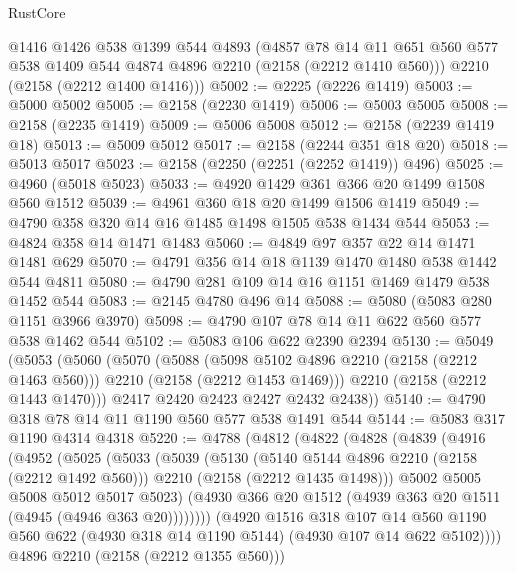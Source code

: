 \begin{lexlean}{RustCore}
\begin{coremodule}
      @1416
      @1426
      @538
      @1399
      @544
      @4893
      (@4857
        @78
        @14
        @11
        @651
        @560
        @577
        @538
        @1409
        @544
        @4874
        @4896
        @2210
        (@2158 (@2212 @1410 @560)))
      @2210
      (@2158 (@2212 @1400 @1416)))
@5002 := @2225 (@2226 @1419)
@5003 := @5000 @5002
@5005 := @2158 (@2230 @1419)
@5006 := @5003 @5005
@5008 := @2158 (@2235 @1419)
@5009 := @5006 @5008
@5012 := @2158 (@2239 @1419 @18)
@5013 := @5009 @5012
@5017 := @2158 (@2244 @351 @18 @20)
@5018 := @5013 @5017
@5023 := @2158 (@2250 (@2251 (@2252 @1419)) @496)
@5025 := @4960 (@5018 @5023)
@5033 := @4920 @1429 @361 @366 @20 @1499 @1508 @560 @1512
@5039 := @4961 @360 @18 @20 @1499 @1506 @1419
@5049 := @4790 @358 @320 @14 @16 @1485 @1498 @1505 @538 @1434 @544
@5053 := @4824 @358 @14 @1471 @1483
@5060 := @4849 @97 @357 @22 @14 @1471 @1481 @629
@5070 := @4791 @356 @14 @18 @1139 @1470 @1480 @538 @1442 @544 @4811
@5080 := @4790 @281 @109 @14 @16 @1151 @1469 @1479 @538 @1452 @544
@5083 := @2145 @4780 @496 @14
@5088 := @5080 (@5083 @280 @1151 @3966 @3970)
@5098 := @4790 @107 @78 @14 @11 @622 @560 @577 @538 @1462 @544
@5102 := @5083 @106 @622 @2390 @2394
@5130 := @5049
    (@5053
      (@5060
        (@5070
          (@5088
            (@5098 @5102 @4896 @2210 (@2158 (@2212 @1463 @560)))
            @2210
            (@2158 (@2212 @1453 @1469)))
          @2210
          (@2158 (@2212 @1443 @1470)))
        @2417
        @2420
        @2423
        @2427
        @2432
        @2438))
@5140 := @4790 @318 @78 @14 @11 @1190 @560 @577 @538 @1491 @544
@5144 := @5083 @317 @1190 @4314 @4318
@5220 := @4788
    (@4812
      (@4822
        (@4828
          (@4839
            (@4916
              (@4952
                (@5025
                  (@5033
                    (@5039
                      (@5130
                        (@5140 @5144 @4896 @2210 (@2158 (@2212 @1492 @560)))
                        @2210
                        (@2158 (@2212 @1435 @1498)))
                      @5002
                      @5005
                      @5008
                      @5012
                      @5017
                      @5023)
                    (@4930 @366 @20 @1512 (@4939 @363 @20 @1511 (@4945 (@4946 @363 @20))))))))
            (@4920
              @1516
              @318
              @107
              @14
              @560
              @1190
              @560
              @622
              (@4930 @318 @14 @1190 @5144)
              (@4930 @107 @14 @622 @5102))))
        @4896
        @2210
        (@2158 (@2212 @1355 @560)))

\end{coremodule}
\end{lexlean}

